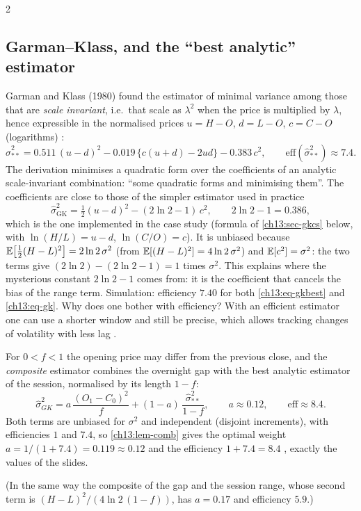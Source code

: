 \begin{paracol}{2}
\subsection{Garman--Klass, and the ``best analytic'' estimator}\label{ch13:sec-gk}
Garman and Klass (1980) found the estimator of minimal variance among those that are \emph{scale invariant}, i.e.\ that
scale as $\lambda^2$ when the price is multiplied by $\lambda$, hence expressible in the normalised prices
$u=H-O$, $d=L-O$, $c=C-O$ (logarithms) :
\begin{equation}\label{ch13:eq-gkbest}
  \hat\sigma_{**}^2=0.511\,(u-d)^2-0.019\,\bigl\{c(u+d)-2ud\bigr\}-0.383\,c^2,\qquad \mathrm{eff}(\hat\sigma^2_{**})\approx7.4 .
\end{equation}
The derivation minimises a quadratic form over the coefficients of an analytic scale-invariant combination: ``some quadratic
forms and minimising them''. The coefficients are close to those of the simpler estimator used in practice
\begin{equation}\label{ch13:eq-gk}
  \hat\sigma^2_{\mathrm{GK}}=\tfrac12(u-d)^2-(2\ln2-1)\,c^2,\qquad 2\ln2-1=0.386,
\end{equation}
which is the one implemented in the case study (formula of \cref{ch13:sec-gkcs} below, with $\ln(H/L)=u-d$, $\ln(C/O)=c$).
It is unbiased because $\mathbb{E}\bigl[\tfrac12(H-L)^2\bigr]=2\ln2\,\sigma^2$ (from $\mathbb{E}[(H-L)^2]=4\ln2\,\sigma^2$) and $\mathbb{E}[c^2]=\sigma^2$: the two terms give
$(2\ln2)-(2\ln2-1)=1$ times $\sigma^2$. This explains where the mysterious constant $2\ln2-1$ comes from: it is the coefficient that cancels the
bias of the range term. Simulation: efficiency $7.40$ for both \eqref{ch13:eq-gkbest} and \eqref{ch13:eq-gk}.
Why does one bother with efficiency? With an efficient estimator one can use a shorter window and still be precise, which allows
tracking changes of volatility with less lag .

For $0<f<1$ the opening price may differ from the previous close, and the \emph{composite} estimator combines the overnight gap with the
best analytic estimator of the session, normalised by its length $1-f$:
\begin{equation}\label{ch13:eq-gkcomp}
  \hat\sigma^2_{G K}=a\,\frac{(O_1-C_0)^2}{f}+(1-a)\,\frac{\hat\sigma^2_{**}}{1-f},\qquad a\approx0.12,\qquad
  \mathrm{eff}\approx8.4 .
\end{equation}
Both terms are unbiased for $\sigma^2$ and independent (disjoint increments), with efficiencies $1$ and $7.4$, so
\cref{ch13:lem-comb} gives the optimal weight $a=1/(1+7.4)=0.119\approx0.12$ and the efficiency $1+7.4=8.4$ , exactly the values of
the slides.
\begin{secondary}
(In the same way the composite of the gap and the session range, whose second term is
$(H-L)^2/(4\ln2\,(1-f))$, has $a=0.17$ and efficiency $5.9$.)
\end{secondary}


\end{paracol}

